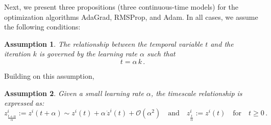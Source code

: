 \documentclass{article} %
\newtheorem{assumption}{Assumption}
\begin{document}
Next, we present three propositions (three continuous-time models) for the optimization algorithms AdaGrad, RMSProp, and Adam. In all cases, we assume the following conditions:

\begin{assumption}\label{Ass:Assumption_t}
The relationship between the temporal variable \( t \) and the iteration \( k \) is governed by the learning rate \( \alpha \) such that
\begin{equation}
 t = \alpha\,k\,.
\end{equation}
\end{assumption}

Building on this assumption,
\begin{assumption}\label{Ass:Assumption}
Given a small learning rate \( \alpha \), the timescale relationship is expressed as:
\[
z^i_{\frac{t+\alpha}{\alpha}} := z^i(t+\alpha) \sim z^i(t) + \alpha\,\dot z^i(t) + \mathcal{O}(\alpha^2) \quad \text{and} \quad z^i_{\frac{t}{\alpha}} := z^i(t) \quad \text{for} \quad  t \geq 0\,.
\]
\end{assumption}
\end{document}
